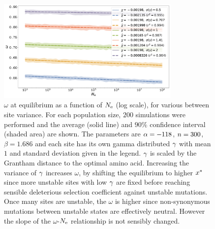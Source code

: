 \documentclass{article}
\begin{document}
\begin{figure}[H]
    \centering
    \includegraphics[width=0.8\textwidth] {SimuStab-Grantham-GammaStd-Elasticity.pdf}
    \caption[Effect of site variance on the susceptibility]{
    $\omega$ at equilibrium as a function of $N_{\text{e}}$ (log scale), for various between site variance.
    For each population size, $200$ simulations were performed and the average (solid line) and $90\%$ confidence interval (shaded area) are shown.
    The parameters are $\alpha=-118$, $n=300$, $\beta=1.686$ and each site has its own gamma distributed $\gamma$ with mean $1$ and standard deviation given in the legend. $\gamma$ is scaled by the Grantham distance to the optimal amino acid.
    Increasing the variance of $\gamma$ increases $\omega$, by shifting the equilibrium to higher $x^{*}$ since more unstable sites with low $\gamma$ are fixed before reaching sensible deleterious selection coefficient against unstable mutations. Once many sites are unstable, the $\omega$ is higher since {non-synonymous} mutations between unstable states are effectively {neutral}. However the slope of the $\omega$-$N_{\text{e}}$ relationship is not sensibly changed.
    }
\end{figure}
\end{document}
